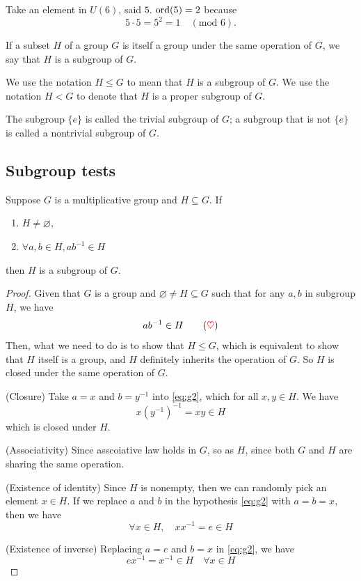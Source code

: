 \begin{example}
    Take an element in $U(6)$, said $5$. $\operatorname{ord}(5) = 2$ because 
    \[
        5 \cdot 5 = 5^2 = 1 \quad (\text{mod } 6).
    \] 
\end{example}

\begin{definition}[Subgroups]
    If a subset $H$ of a group $G$ is itself a group under the same operation of $G$, we say that $H$ is a subgroup of $G$.
\end{definition}

\begin{remark}
    We use the notation $H \leq G$ to mean that $H$ is a subgroup of $G$. We use the notation $H < G$ to denote that 
$H$ is a proper subgroup of $G$. 

The subgroup $\{ e \}$ is called the trivial subgroup of $G$; a subgroup that is not 
$\{ e \}$ is called a nontrivial subgroup of $G$.
\end{remark}

\subsection{Subgroup tests}

\begin{theorem}
    Suppose $G$ is a multiplicative group and $H \subseteq G$. If 
    \begin{enumerate}
        \item $H \neq \varnothing$,
        \item $\forall a, b \in H, ab^{-1} \in H$
    \end{enumerate}
    then $H$ is a subgroup of $G$. 
\end{theorem}
\begin{proof}
    Given that $G$ is a group and $\varnothing \neq H \subseteq G$ such that for any $a, b$ in subgroup $H$, we have 
    \begin{equation*}
        ab^{-1} \in H   \label{eq:g2} \tag{{\color{red} $\heartsuit $}}
    \end{equation*}
    Then, what we need to do is to show that $H \leq G$, which is equivalent to show that $H$ itself is a group, and $H$ 
    definitely inherits the operation of $G$. So $H$ is closed under the same operation of $G$.

    (Closure) Take $a = x$ and $b = y^{-1}$ into \eqref{eq:g2}, which for all $x, y \in H$. We have 
    \[
        x(y^{-1})^{-1} = xy \in H
    \]
    which is closed under $H$.

    (Associativity) Since asscoiative law holds in $G$, so as $H$, since both $G$ and $H$ are sharing the 
    same operation.
    
    (Existence of identity) Since $H$ is nonempty, then we can randomly pick an element $x \in H$. If we 
    replace $a$ and $b$ in the hypothesis \eqref{eq:g2} with $a = b = x$, then we have 
    \[
        \forall x \in H,\quad xx^{-1} = e \in H
    \]

    (Existence of inverse) Replacing $a = e$ and $b = x$ in \eqref{eq:g2}, we have 
    \[
        ex^{-1} = x^{-1} \in H \quad \forall x \in H 
    \]
\end{proof}

